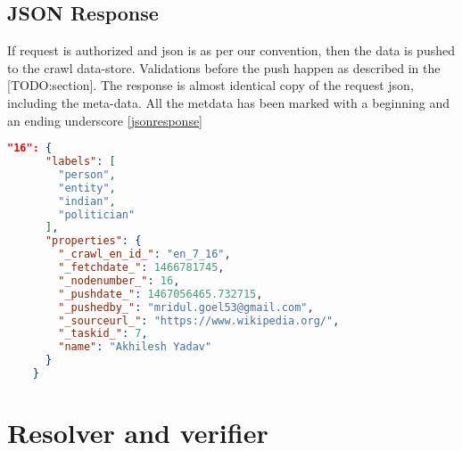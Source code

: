 \subsection{JSON Response}
If request is authorized and json is as per our convention, then the data is pushed to the crawl data-store. Validations before the push happen as described in the [TODO:section]. The response is almost identical copy of the request json, including the meta-data. All the metdata has been marked with a beginning and an ending underscore \ref{jsonresponse} \\


\label{jsonresponse}
\begin{lstlisting}[language=json,firstnumber=1]
"16": {
      "labels": [
        "person",
        "entity",
        "indian",
        "politician"
      ],
      "properties": {
        "_crawl_en_id_": "en_7_16",
        "_fetchdate_": 1466781745,
        "_nodenumber_": 16,
        "_pushdate_": 1467056465.732715,
        "_pushedby_": "mridul.goel53@gmail.com",
        "_sourceurl_": "https://www.wikipedia.org/",
        "_taskid_": 7,
        "name": "Akhilesh Yadav"
      }
    }
\end{lstlisting}


\section{Resolver and verifier}

